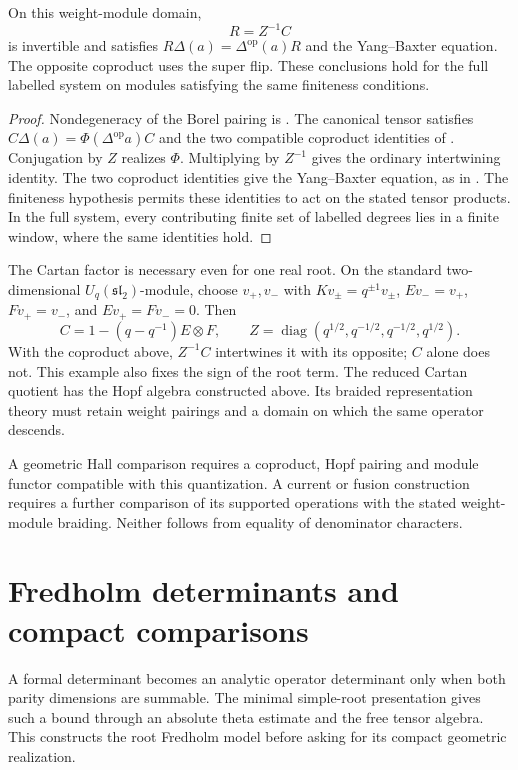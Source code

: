 \begin{theorem}
On this weight-module domain,
\[
 R=Z^{-1}C
\]
is invertible and satisfies \(R\Delta(a)=\Delta^{\mathrm{op}}(a)R\)
and the Yang--Baxter equation. The opposite coproduct uses the
super flip. These conclusions hold for the full labelled system
on modules satisfying the same finiteness conditions.
\end{theorem}
\begin{proof}
Nondegeneracy of the Borel pairing is
\cite[Theorem~4.6]{Hong98}. The canonical tensor satisfies
\(C\Delta(a)=\Phi(\Delta^{\mathrm{op}}a)C\) and the two
compatible coproduct identities of \cite[Propositions~7.4--7.5 and Theorem~7.6]{Hong98}.
Conjugation by \(Z\) realizes \(\Phi\). Multiplying by
\(Z^{-1}\) gives the ordinary intertwining identity. The two
coproduct identities give the Yang--Baxter equation, as in
\cite[Theorem~7.7]{Hong98}. The finiteness hypothesis permits these
identities to act on the stated tensor products. In the full system,
every contributing finite set of labelled degrees lies in a finite
window, where the same identities hold.
\end{proof}

The Cartan factor is necessary even for one real root. On the
standard two-dimensional \(U_q(\mathfrak{sl}_2)\)-module,
choose $v_+,v_-$ with $Kv_\pm=q^{\pm1}v_\pm$, $Ev_-=v_+$,
$Fv_+=v_-$, and $Ev_+=Fv_-=0$. Then
\[
 C=1-(q-q^{-1})E\otimes F,\qquad
 Z=\operatorname{diag}(q^{1/2},q^{-1/2},q^{-1/2},q^{1/2}).
\]
With the coproduct above, \(Z^{-1}C\) intertwines it with its
opposite; \(C\) alone does not. This example also fixes the sign
of the root term. The reduced Cartan quotient has the Hopf algebra
constructed above. Its braided representation theory must retain
weight pairings and a domain on which the same operator descends.

A geometric Hall comparison requires a coproduct, Hopf pairing and
module functor compatible with this quantization. A current or
fusion construction requires a further comparison of its supported
operations with the stated weight-module braiding. Neither follows
from equality of denominator characters.

\chapter{Fredholm determinants and compact comparisons}
\label{comp:ch:root-operators}

A formal determinant becomes an analytic operator determinant only
when both parity dimensions are summable. The minimal simple-root
presentation gives such a bound through an absolute theta estimate
and the free tensor algebra. This constructs the root Fredholm
model before asking for its compact geometric realization.

